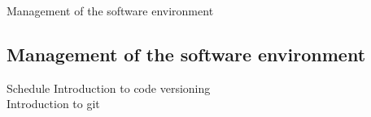 \begin{frame}{Management of the software environment}
\end{frame}
\subsection{Management of the software environment}
\begin{frame}{Schedule}
Introduction to code versioning\\
Introduction to git\\
\end{frame}